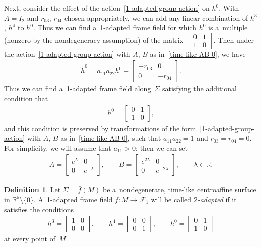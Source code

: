 \documentclass[10pt,a4paper]{amsart}
\numberwithin{equation}{section}
\theoremstyle{definition}
\newtheorem{dfn}[teo]{Definition}
\begin{document}
Next, consider the ef\/fect of the action~\eqref{1-adapted-group-action} on $h^0$.
With $A = I_2$ and $r_{03}$, $r_{04}$ chosen appropriately, we can add any linear combination of $h^3$, $h^4$ to $h^0$.
Thus we can f\/ind a~1-adapted frame f\/ield for which $h^0$ is a~multiple (nonzero by the nondegeneracy assumption) of the
matrix $
\begin{bmatrix}
0 & 1
\\
1 & 0
\end{bmatrix}
$.
Then under the action~\eqref{1-adapted-group-action} with $A$, $B$ as in~\eqref{time-like-AB-0}, we have
\begin{gather*}
\tilde{h}^0 = a_{11} a_{22} h^0 +
\begin{bmatrix}
-r_{03} & 0
\\
0 & -r_{04}
\end{bmatrix}.
\end{gather*}
Thus we can f\/ind a~1-adapted frame f\/ield along~$\Sigma$ satisfying the additional condition that
\begin{gather*}
h^0 =
\begin{bmatrix}
0 & 1
\\
1 & 0
\end{bmatrix},
\end{gather*}
and this condition is preserved by transformations of the form~\eqref{1-adapted-group-action} with $A$, $B$ as
in~\eqref{time-like-AB-0}, such that $a_{11} a_{22}=1$ and $r_{03} = r_{04} = 0$.
For simplicity, we will assume that $a_{11} > 0$; then we can set
\begin{gather*}
A=
\begin{bmatrix}
e^\lambda & 0
\\
0 & e^{-\lambda}
\end{bmatrix},
\qquad
B =
\begin{bmatrix}
e^{2\lambda} & 0
\\
0 & e^{-2\lambda}
\end{bmatrix},
\qquad
\lambda \in \mathbb{R}.
\end{gather*}

\begin{dfn}
Let $\Sigma = \bar{f}(M)$ be a~nondegenerate, time-like centroaf\/f\/ine surface in $\mathbb{R}^5 \setminus \{0\}$.
A~1-adapted frame f\/ield $f:M \to \mathcal{F}_1$ will be called {\em $2$-adapted} if it satisf\/ies the conditions
\begin{gather}
h^3 =
\begin{bmatrix}
1 & 0
\\
0 & 0
\end{bmatrix},
\qquad
h^4 =
\begin{bmatrix}
0 & 0
\\
0 & 1
\end{bmatrix},
\qquad
h^0 =
\begin{bmatrix}
0 & 1
\\
1 & 0
\end{bmatrix}
\label{2-adapted-time-like-h}
\end{gather}
at every point of~$M$.
\end{dfn}
\end{document}
